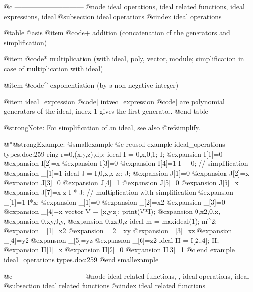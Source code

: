 @c ------------------------------
@node ideal operations, ideal related functions, ideal expressions, ideal
@subsection ideal operations
@cindex ideal operations

@table @asis
@item @code{+}
addition (concatenation of the generators and simplification)

@item @code{*}
multiplication (with ideal, poly, vector, module; simplification in case of
multiplication with ideal)

@item @code{^}
exponentiation (by a non-negative integer)

@item ideal_expression @code{[} intvec_expression @code{]}
are polynomial generators of the ideal, index 1 gives the first generator.
@end table

@strong{Note:} For simplification of an ideal, see also @ref{simplify}.

@*@strong{Example:}
@smallexample
@c reused example ideal_operations types.doc:259 
  ring r=0,(x,y,z),dp;
  ideal I = 0,x,0,1;
  I;
@expansion{} I[1]=0
@expansion{} I[2]=x
@expansion{} I[3]=0
@expansion{} I[4]=1
  I + 0;    // simplification
@expansion{} _[1]=1
  ideal J = I,0,x,x-z;;
  J;
@expansion{} J[1]=0
@expansion{} J[2]=x
@expansion{} J[3]=0
@expansion{} J[4]=1
@expansion{} J[5]=0
@expansion{} J[6]=x
@expansion{} J[7]=x-z
  I * J;   //  multiplication with simplification
@expansion{} _[1]=1
  I*x;
@expansion{} _[1]=0
@expansion{} _[2]=x2
@expansion{} _[3]=0
@expansion{} _[4]=x
  vector V = [x,y,z];
  print(V*I);
@expansion{} 0,x2,0,x,
@expansion{} 0,xy,0,y,
@expansion{} 0,xz,0,z 
  ideal m = maxideal(1);
  m^2;
@expansion{} _[1]=x2
@expansion{} _[2]=xy
@expansion{} _[3]=xz
@expansion{} _[4]=y2
@expansion{} _[5]=yz
@expansion{} _[6]=z2
  ideal II = I[2..4];
  II;
@expansion{} II[1]=x
@expansion{} II[2]=0
@expansion{} II[3]=1
@c end example ideal_operations types.doc:259
@end smallexample

@c ------------------------------
@node ideal related functions,  , ideal operations, ideal
@subsection ideal related functions
@cindex ideal related functions

